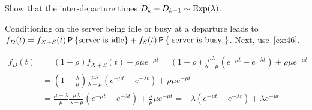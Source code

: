 \documentclass[stochastic-or.tex]{subfiles}
\begin{document}
\begin{exercise}\label{ex:63}
Show that the inter-departure times $D_k -D_{k-1} \sim \Exp{\lambda}$.
\begin{hint}
Conditioning on the server being idle or busy at a departure leads to
$f_D(t) = f_{X+S}(t) \P{\text{server is idle}} + f_S(t) \P{\text{ server is busy }}$.
Next, use~\cref{ex:46}.
\end{hint}
\begin{solution}
 \begin{align*}
 f_D(t)
&= (1-\rho) f_{X+S}(t) + \rho \mu e^{-\mu t}
= (1-\rho) \frac{\mu\lambda}{\lambda-\mu} \left(e^{-\mu t}-e^{-\lambda t}\right) + \rho \mu e^{-\mu t} \\
&= \left(1-\frac{\lambda}\mu\right) \frac{\mu\lambda}{\lambda-\mu}\left(e^{-\mu t}-e^{-\lambda t}\right) + \rho \mu e^{-\mu t} \\
&= \frac{\mu-\lambda}\mu \frac{\mu\lambda}{\lambda-\mu}\left(e^{-\mu t}-e^{-\lambda t}\right) + \frac\lambda \mu \mu e^{-\mu t}
= - \lambda\left(e^{-\mu t}-e^{-\lambda t}\right) + \lambda e^{-\mu t}
 \end{align*}
\end{solution}
\end{exercise}
\end{document}

